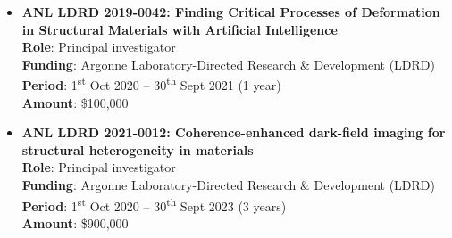 \documentclass[10pt]{article}
\begin{document}
\begin{itemize}
    \item \textbf{ANL LDRD 2019-0042: Finding Critical Processes of Deformation in Structural Materials with Artificial Intelligence}\\
        \textbf{Role}: Principal investigator \\
        \textbf{Funding}: Argonne Laboratory-Directed Research \& Development (LDRD) \\
        \textbf{Period}: 1\textsuperscript{st} Oct 2020 -- 30\textsuperscript{th} Sept 2021 (1 year) \\
        \textbf{Amount}: \$100,000
    \item \textbf{ANL LDRD 2021-0012: Coherence-enhanced dark-field imaging for structural heterogeneity in materials}\\
        \textbf{Role}: Principal investigator \\
        \textbf{Funding}: Argonne Laboratory-Directed Research \& Development (LDRD) \\
        \textbf{Period}: 1\textsuperscript{st} Oct 2020 -- 30\textsuperscript{th} Sept 2023 (3 years) \\
        \textbf{Amount}: \$900,000
\end{itemize} 
\end{document}
